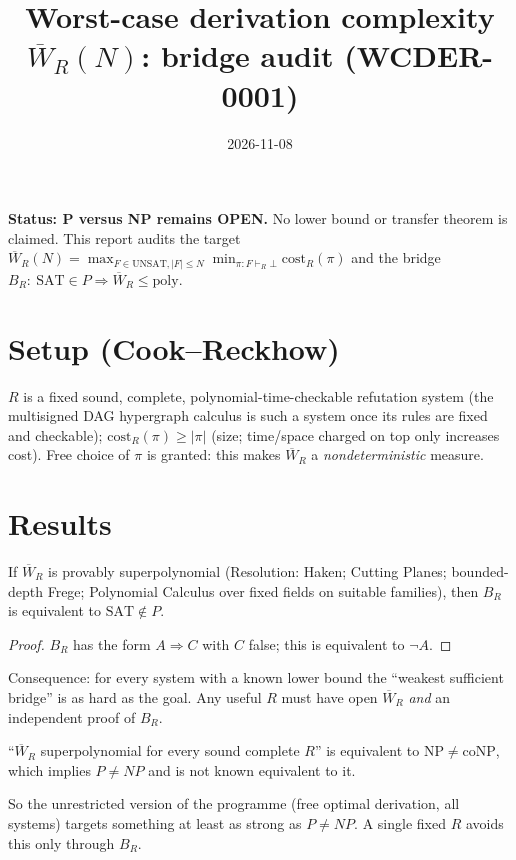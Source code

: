 \documentclass{article}
\title{Worst-case derivation complexity $\overline W_R(N)$: bridge audit (WCDER-0001)}
\date{2026-11-08}
\begin{document}
\maketitle
\noindent\textbf{Status: P versus NP remains OPEN.} No lower bound or transfer theorem is claimed. This report audits the target
$\overline W_R(N)=\max_{F\in\mathrm{UNSAT},|F|\le N}\min_{\pi:F\vdash_R\bot}\mathrm{cost}_R(\pi)$ and the bridge $B_R:\ \mathrm{SAT}\in P\Rightarrow\overline W_R\le\mathrm{poly}$.

\section*{Setup (Cook--Reckhow)}
$R$ is a fixed sound, complete, polynomial-time-checkable refutation system (the multisigned DAG hypergraph calculus is such a system once its rules are fixed and checkable); $\mathrm{cost}_R(\pi)\ge|\pi|$ (size; time/space charged on top only increases cost). Free choice of $\pi$ is granted: this makes $\overline W_R$ a \emph{nondeterministic} measure.

\section*{Results}
\begin{prop} If $\overline W_R$ is provably superpolynomial (Resolution: Haken; Cutting Planes; bounded-depth Frege; Polynomial Calculus over fixed fields on suitable families), then $B_R$ is equivalent to $\mathrm{SAT}\notin P$.\end{prop}
\begin{proof}$B_R$ has the form $A\Rightarrow C$ with $C$ false; this is equivalent to $\neg A$.\end{proof}
Consequence: for every system with a known lower bound the ``weakest sufficient bridge'' is as hard as the goal. Any useful $R$ must have open $\overline W_R$ \emph{and} an independent proof of $B_R$.

\begin{prop} ``$\overline W_R$ superpolynomial for every sound complete $R$'' is equivalent to $\mathrm{NP}\ne\mathrm{coNP}$, which implies $P\ne NP$ and is not known equivalent to it.\end{prop}
So the unrestricted version of the programme (free optimal derivation, all systems) targets something at least as strong as $P\neq NP$. A single fixed $R$ avoids this only through $B_R$.
\end{document}
